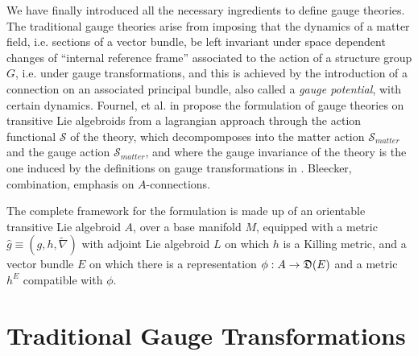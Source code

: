 We have finally introduced all the necessary ingredients to define gauge theories. The traditional gauge theories arise from imposing that the dynamics of a matter field, i.e. sections of a vector bundle, be left invariant under space dependent changes of ``internal reference frame'' associated to the action of a structure group $G$, i.e. under gauge transformations, and this is achieved by the introduction of a connection on an associated principal bundle, also called a \emph{gauge potential}, with certain dynamics. Fournel, et al. in \cite{Fournel2013} propose the formulation of gauge theories on transitive Lie algebroids from a lagrangian approach through the action functional $\mathcal S$ of the theory, which decompomposes into the matter action $\mathcal S_{matter}$ and the gauge action $\mathcal S_{matter}$, and where the gauge invariance of the theory is the one induced by the definitions on gauge transformations in \cite{Lazzarini2012}. Bleecker, combination, emphasis on $A$-connections.

The complete framework for the formulation is made up of an orientable transitive Lie algebroid $A$, over a base manifold $M$, equipped with a metric $\hat g \equiv (g, h, \tilde \nabla)$ with adjoint Lie algebroid $L$ on which $h$ is a Killing metric, and a vector bundle $E$ on which there is a representation $\phi: A \to \alg D(E)$ and a metric $h^E$ compatible with $\phi$.

\section{Traditional Gauge Transformations}
\label{chGaugeSectionTraditional}






